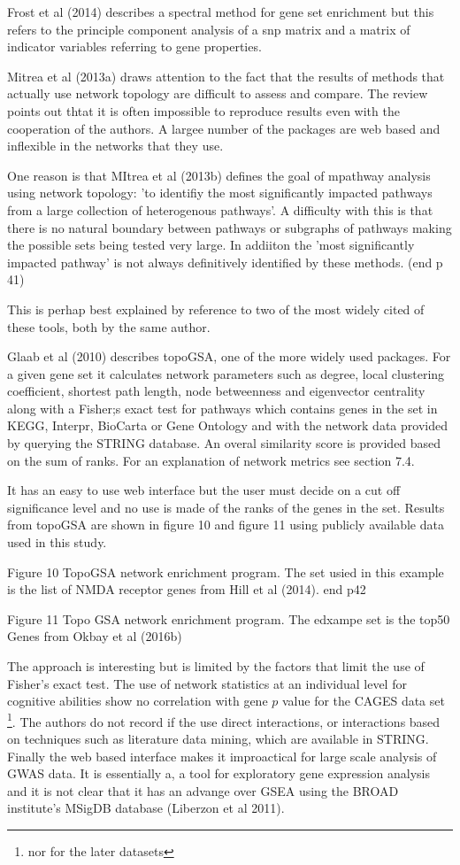 Frost et al (2014) describes a spectral method for gene set enrichment but this refers to the principle component analysis of a snp matrix and a matrix of indicator variables referring to gene properties.

Mitrea et al (2013a) draws attention to the fact that the results of methods that actually use network topology are difficult to assess and compare. The review points out thtat it is often impossible to reproduce results even with the cooperation of the authors. A largee number of the packages are web based and inflexible in the networks that they use.

One reason is that MItrea et al (2013b) defines the goal of mpathway analysis using network topology: 'to identifiy the most significantly impacted pathways from a large collection of heterogenous pathways'. A difficulty with this is that there is no natural boundary between pathways or subgraphs of pathways making the possible sets being tested very large. In addiiton the 'most significantly impacted pathway' is not always definitively identified by these methods.  (end p 41)

This is perhap best explained by reference to two of the most widely cited of these tools, both by the same author. 

Glaab et al (2010) describes topoGSA, one of the more widely used packages. For a given gene set it calculates network parameters such as degree, local clustering coefficient, shortest path length, node betweenness and eigenvector centrality along with a Fisher;s exact test for pathways which contains genes in the set in KEGG, Interpr, BioCarta or Gene Ontology and with the network data provided by querying the STRING database. An overal similarity score is provided based on the sum of ranks. For an explanation of network metrics see section 7.4.

It has an easy to use web interface but the user must decide on a cut off significance level and no use is made of the ranks of the genes in the set. Results from topoGSA are shown in figure 10 and figure 11 using publicly available data used in this study.

Figure 10 TopoGSA network enrichment program. The set usied in this example is the list of NMDA receptor genes from Hill et al (2014). end p42

Figure 11 Topo GSA network enrichment program. The edxampe set is the top50 Genes from Okbay et al (2016b)

The approach is interesting but is limited by the factors that limit the use of Fisher's exact test. The use of network statistics at an individual level for cognitive abilities show no correlation with gene $p$ value for the CAGES data set \footnote{nor for the later datasets}. The authors do not record if the use direct interactions, or interactions based on techniques such as literature data mining, which are available in STRING. Finally the web based interface makes it improactical for large scale analysis of GWAS data. It is essentially a, a tool for exploratory gene expression analysis and it is not clear that it has an advange over GSEA using the BROAD institute's MSigDB database (Liberzon et al 2011). 

